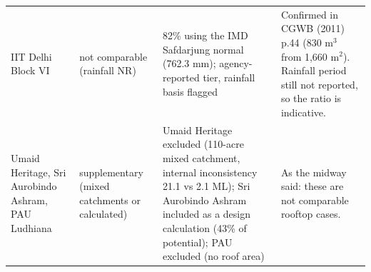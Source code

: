 {\begin{longtable}{p{2.3cm} p{3.4cm} p{4.6cm} p{5.6cm}}
IIT Delhi Block VI & not comparable (rainfall NR) & 82\% using the IMD Safdarjung normal (762.3 mm); agency-reported tier, rainfall basis flagged & Confirmed in CGWB (2011) p.44 (830 m$^3$ from 1,660 m$^2$). Rainfall period still not reported, so the ratio is indicative.\\
Umaid Heritage, Sri Aurobindo Ashram, PAU Ludhiana & supplementary (mixed catchments or calculated) & Umaid Heritage excluded (110-acre mixed catchment, internal inconsistency 21.1 vs 2.1 ML); Sri Aurobindo Ashram included as a design calculation (43\% of potential); PAU excluded (no roof area) & As the midway said: these are not comparable rooftop cases.\\
\end{longtable}}
